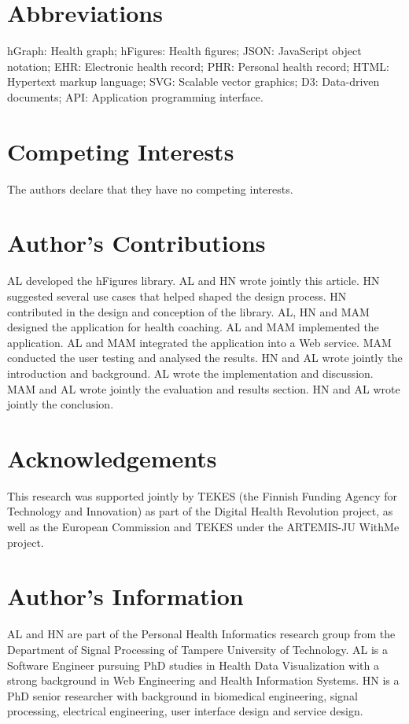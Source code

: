 \documentclass[twocolumn]{bmcart}%
\begin{document}
\begin{backmatter}

\section*{Abbreviations}
    hGraph: Health graph; hFigures: Health figures; JSON: JavaScript object notation; EHR: Electronic health record; PHR: Personal health record; HTML: Hypertext markup language; SVG: Scalable vector graphics; D3: Data-driven documents; API: Application programming interface.

\section*{Competing Interests}
    The authors declare that they have no competing interests.

\section*{Author's Contributions}
AL developed the hFigures library. AL and HN wrote jointly this article. HN suggested several use cases that helped shaped the design process. HN contributed in the design and conception of the library. AL, HN and MAM designed the application for health coaching. AL and MAM implemented the application. AL and MAM integrated the application into a Web service. MAM conducted the user testing and analysed the results. HN and AL wrote jointly the introduction and background. AL wrote the implementation and discussion. MAM and AL wrote jointly the evaluation and results section. HN and AL wrote jointly the conclusion.
    
\section*{Acknowledgements}
This research was supported jointly by TEKES (the Finnish Funding Agency for Technology and Innovation) as part of the Digital Health Revolution project, as well as the European Commission and TEKES under the ARTEMIS-JU WithMe project.
  
\section*{Author's Information}
AL and HN are part of the Personal Health Informatics research group from the Department of Signal Processing of Tampere University of Technology. AL is a Software Engineer pursuing PhD studies in Health Data Visualization with a strong background in Web Engineering and Health Information Systems. HN is a PhD senior researcher with background in biomedical engineering, signal processing, electrical engineering, user interface design and service design.


\end{backmatter}
\end{document}

